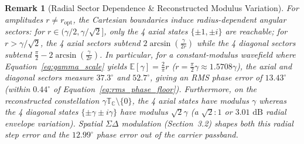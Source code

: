 \documentclass[10pt, twocolumn, a4paper]{article}
\newtheorem{remark}{Remark}
\begin{document}
\begin{remark}[Radial Sector Dependence \& Reconstructed Modulus Variation]
For amplitudes $r \neq r_{\text{opt}}$, the Cartesian boundaries induce radius-dependent angular sectors: for $r \in (\gamma/2, \gamma/\sqrt{2}]$, only the 4 axial states $\{\pm 1, \pm i\}$ are reachable; for $r > \gamma/\sqrt{2}$, the 4 axial sectors subtend $2\arcsin(\frac{\gamma}{2r})$ while the 4 diagonal sectors subtend $\frac{\pi}{2} - 2\arcsin(\frac{\gamma}{2r})$. In particular, for a constant-modulus wavefield where Equation~\eqref{eq:gamma_scale} yields $\mathbb{E}[\gamma] = \frac{2}{\pi}r$ ($r = \frac{\pi}{2}\gamma \approx 1.5708\gamma$), the axial and diagonal sectors measure $37.3^\circ$ and $52.7^\circ$, giving an RMS phase error of $13.43^\circ$ (within $0.44^\circ$ of Equation~\ref{eq:rms_phase_floor}). Furthermore, on the reconstructed constellation $\gamma\mathbb{T}_{\mathbb{C}} \setminus \{0\}$, the 4 axial states have modulus $\gamma$ whereas the 4 diagonal states $\{\pm\gamma \pm i\gamma\}$ have modulus $\sqrt{2}\gamma$ (a $\sqrt{2}:1$ or $3.01\text{ dB}$ radial envelope variation). Spatial $\Sigma\Delta$ modulation (Section~3.2) shapes both this radial step error and the $12.99^\circ$ phase error out of the carrier passband.
\end{remark}
\end{document}
